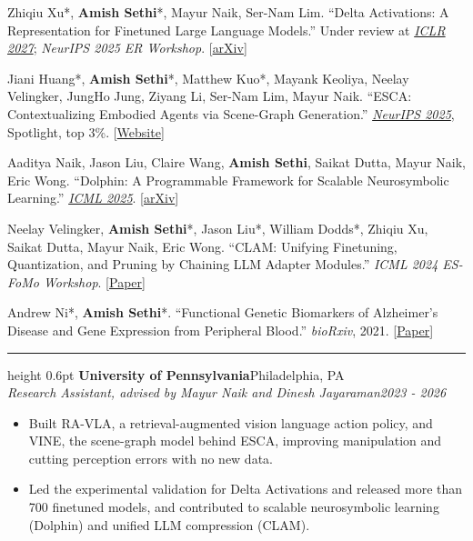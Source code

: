 \documentclass[letterpaper,11pt]{article}
\newenvironment{tight}{%
  \begin{itemize}\setlength{\itemsep}{0pt}\setlength{\parsep}{0pt}\setlength{\topsep}{1pt}}%
  {\end{itemize}}
\newcommand{\rsection}[1]{%
  \vspace{5pt}{\scshape\Large #1}\par\vspace{2pt}\hrule height 0.6pt\vspace{3pt}}
\newcommand{\linkhref}[2]{\textcolor{linkblue}{\href{#1}{#2}}}
\newcommand{\heading}[4]{\textbf{#1}\hfill #2\\\textit{\small #3}\hfill \textit{\small #4}}
\begin{document}
\vspace{3pt}
Zhiqiu Xu*, \textbf{Amish Sethi}*, Mayur Naik, Ser-Nam Lim. ``Delta Activations: A Representation for Finetuned Large Language Models.'' Under review at \textit{\linkhref{https://iclr.cc}{ICLR 2027}}; \textit{NeurIPS 2025 ER Workshop}. \hfill [\linkhref{https://arxiv.org/abs/2509.04442}{arXiv}]

\vspace{3pt}
Jiani Huang*, \textbf{Amish Sethi}*, Matthew Kuo*, Mayank Keoliya, Neelay Velingker, JungHo Jung, Ziyang Li, Ser-Nam Lim, Mayur Naik. ``ESCA: Contextualizing Embodied Agents via Scene-Graph Generation.'' \textit{\linkhref{https://neurips.cc/Conferences/2025}{NeurIPS 2025}}, Spotlight, top 3\%. \hfill [\linkhref{https://video-fm.github.io}{Website}]

\vspace{3pt}
Aaditya Naik, Jason Liu, Claire Wang, \textbf{Amish Sethi}, Saikat Dutta, Mayur Naik, Eric Wong. ``Dolphin: A Programmable Framework for Scalable Neurosymbolic Learning.'' \textit{\linkhref{https://icml.cc/Conferences/2025}{ICML 2025}}. \hfill [\linkhref{https://arxiv.org/abs/2410.03348}{arXiv}]

\vspace{3pt}
Neelay Velingker, \textbf{Amish Sethi}*, Jason Liu*, William Dodds*, Zhiqiu Xu, Saikat Dutta, Mayur Naik, Eric Wong. ``CLAM: Unifying Finetuning, Quantization, and Pruning by Chaining LLM Adapter Modules.'' \textit{ICML 2024 ES-FoMo Workshop}. \hfill [\linkhref{https://openreview.net/pdf?id=1mKtFkElnu}{Paper}]

\vspace{3pt}
Andrew Ni*, \textbf{Amish Sethi}*. ``Functional Genetic Biomarkers of Alzheimer's Disease and Gene Expression from Peripheral Blood.'' \textit{bioRxiv}, 2021. \hfill [\linkhref{https://www.biorxiv.org/content/10.1101/2021.01.15.426891v1.full.pdf}{Paper}]

\newpage
\vspace*{-12pt}
\rsection{Research Experience}
\heading{University of Pennsylvania}{Philadelphia, PA}{Research Assistant, advised by Mayur Naik and Dinesh Jayaraman}{2023 - 2026}
\begin{tight}
  \item Built RA-VLA, a retrieval-augmented vision language action policy, and VINE, the scene-graph model behind ESCA, improving manipulation and cutting perception errors with no new data.
  \item Led the experimental validation for Delta Activations and released more than 700 finetuned models, and contributed to scalable neurosymbolic learning (Dolphin) and unified LLM compression (CLAM).
\end{tight}
\end{document}
